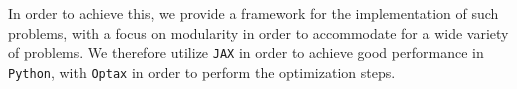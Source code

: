 In order to achieve this, we provide a framework for the implementation of such problems, with a focus on modularity in order to accommodate for a wide variety of problems.
We therefore utilize \verb|JAX| \cite{jax2018github} in order to achieve good performance in \verb|Python|, with \verb|Optax| \cite{deepmind2020jax} in order to perform the optimization steps.








